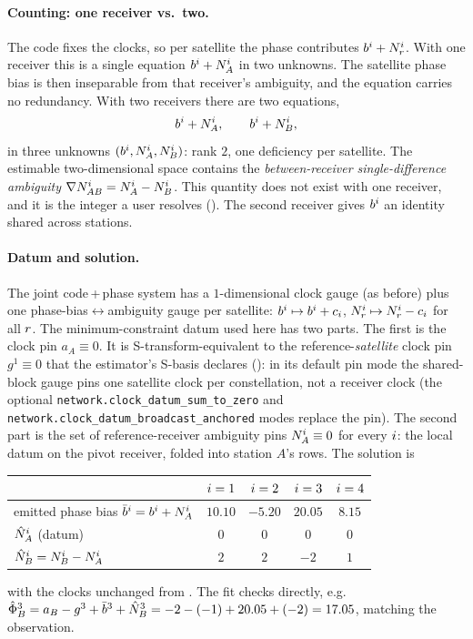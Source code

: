 \documentclass[main.tex]{subfiles}
\begin{document}
\paragraph{Counting: one receiver vs.\ two.}
The code fixes the clocks, so per satellite the phase contributes
$b^i + N^i_r$. With one receiver this is a single equation
$b^i + N^i_A$ in two unknowns. The satellite phase bias is then
inseparable from that receiver's ambiguity, and the equation carries no
redundancy. With two receivers there are two equations,
\begin{equation}
b^i + N^i_A, \qquad b^i + N^i_B,
\label{eq:ex-phase-pair}
\end{equation}
in three unknowns $(b^i, N^i_A, N^i_B)$: rank $2$, one
deficiency per satellite. The estimable two-dimensional space contains
the \emph{between-receiver single-difference ambiguity}
$\nabla N^i_{AB} = N^i_A - N^i_B$. This quantity does not exist
with one receiver, and it is the integer a user resolves
(). The second receiver gives
$b^i$ an identity shared across stations.

\paragraph{Datum and solution.}
The joint code\,+\,phase system has a $1$-dimensional clock gauge (as
before) plus one phase-bias$\leftrightarrow$ambiguity gauge per
satellite: $b^i \mapsto b^i + c_i$, $N^i_r \mapsto
N^i_r - c_i$ for all $r$. The minimum-constraint datum used
here has two parts. The first is the clock pin $a_A \equiv 0$. It is
S-transform-equivalent to the reference-\emph{satellite} clock pin
$g^1 \equiv 0$ that the estimator's S-basis declares
():
in its default pin mode the shared-block gauge pins one satellite clock
per constellation, not a receiver clock (the optional
\texttt{network.clock\_datum\_sum\_to\_zero} and
\texttt{network.clock\_datum\_broadcast\_anchored} modes replace the
pin). The second part is the set of reference-receiver ambiguity pins
$N^i_A \equiv 0$ for every $i$: the local datum on the pivot
receiver, folded into station $A$'s rows. The solution is
\begin{center}
\begin{tabular}{@{}lcccc@{}}
\toprule
& $i=1$ & $i=2$ & $i=3$ & $i=4$ \\
\midrule
emitted phase bias $\bar b^i = b^i + N^i_A$ & $10.10$ & $-5.20$ & $20.05$ & $8.15$ \\
$\hat N^i_A$ (datum) & $0$ & $0$ & $0$ & $0$ \\
$\hat N^i_B = N^i_B - N^i_A$ & $2$ & $2$ & $-2$ & $1$ \\
\bottomrule
\end{tabular}
\end{center}
with the clocks unchanged from . The fit
checks directly, e.g.\
$\hat{\Phi}^3_B = a_B - g^3 + \bar b^3 + \hat N^3_B
   = -2 -(-1) + 20.05 + (-2) = 17.05$, matching the observation.
\end{document}
